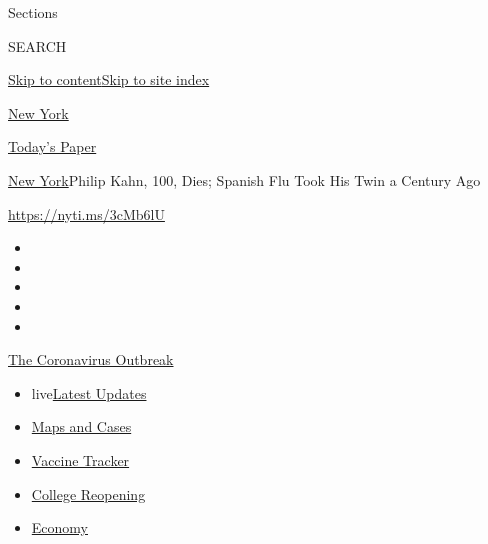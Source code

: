 Sections

SEARCH

\protect\hyperlink{site-content}{Skip to
content}\protect\hyperlink{site-index}{Skip to site index}

\href{https://www.nytimes.com/section/nyregion}{New York}

\href{https://myaccount.nytimes.com/auth/login?response_type=cookie\&client_id=vi}{}

\href{https://www.nytimes.com/section/todayspaper}{Today's Paper}

\href{/section/nyregion}{New York}\textbar{}Philip Kahn, 100, Dies;
Spanish Flu Took His Twin a Century Ago

\url{https://nyti.ms/3cMb6lU}

\begin{itemize}
\item
\item
\item
\item
\item
\end{itemize}

\href{https://www.nytimes.com/news-event/coronavirus?action=click\&pgtype=Article\&state=default\&region=TOP_BANNER\&context=storylines_menu}{The
Coronavirus Outbreak}

\begin{itemize}
\tightlist
\item
  live\href{https://www.nytimes.com/2020/08/03/world/coronavirus-covid-19.html?action=click\&pgtype=Article\&state=default\&region=TOP_BANNER\&context=storylines_menu}{Latest
  Updates}
\item
  \href{https://www.nytimes.com/interactive/2020/us/coronavirus-us-cases.html?action=click\&pgtype=Article\&state=default\&region=TOP_BANNER\&context=storylines_menu}{Maps
  and Cases}
\item
  \href{https://www.nytimes.com/interactive/2020/science/coronavirus-vaccine-tracker.html?action=click\&pgtype=Article\&state=default\&region=TOP_BANNER\&context=storylines_menu}{Vaccine
  Tracker}
\item
  \href{https://www.nytimes.com/2020/08/02/us/covid-college-reopening.html?action=click\&pgtype=Article\&state=default\&region=TOP_BANNER\&context=storylines_menu}{College
  Reopening}
\item
  \href{https://www.nytimes.com/live/2020/08/03/business/stock-market-today-coronavirus?action=click\&pgtype=Article\&state=default\&region=TOP_BANNER\&context=storylines_menu}{Economy}
\end{itemize}

